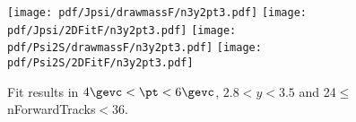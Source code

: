 \begin{figure}[H]
\begin{center}
\texttt{[image: pdf/Jpsi/drawmassF/n3y2pt3.pdf]}
\texttt{[image: pdf/Jpsi/2DFitF/n3y2pt3.pdf]}
\vspace*{-0.5cm}
\texttt{[image: pdf/Psi2S/drawmassF/n3y2pt3.pdf]}
\texttt{[image: pdf/Psi2S/2DFitF/n3y2pt3.pdf]}
\vspace*{-0.5cm}
\end{center}
\caption{Fit results in $4\gevc<\pt<6\gevc$, $2.8<y<3.5$ and 24$\leq$nForwardTracks$<$36.}
\label{Fitn3y2pt3}
\end{figure}

